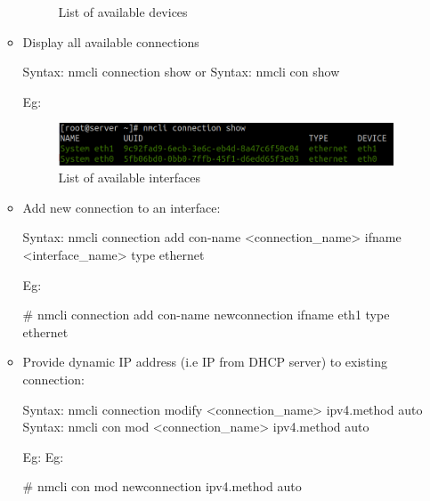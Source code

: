 \begin{flushleft}
\begin{itemize}
\begin{itemize}
\begin{figure}[h!]
			\caption{List of available devices}
			\label{fig:devices}
		\end{figure}		
		\newpage
		\item Display all available connections
		\begin{tcolorbox}[breakable,notitle,boxrule=-0pt,colback=pink,colframe=pink]
			\color{black}
			\font=9pt
			Syntax: nmcli connection show
			\newline
			or
			\newline
			Syntax: nmcli con show
			\font=4pt
		\end{tcolorbox}
		Eg:
		\begin{figure}[h!]
			\centering
			\includegraphics[scale=.35]{content/chapter14/images/show.png}
			\caption{List of available interfaces}
			\label{fig:list}
		\end{figure}		
	
		\bigskip
		\bigskip
		\item Add new connection to an interface:
		\begin{tcolorbox}[breakable,notitle,boxrule=-0pt,colback=pink,colframe=pink]
			\color{black}
			\font=9pt
			Syntax: nmcli connection add con-name <connection\_name> ifname <interface\_name> type ethernet
			\font=4pt
		\end{tcolorbox}

		Eg:	
		\begin{tcolorbox}[breakable,notitle,boxrule=-0pt,colback=black,colframe=black]
			\color{green}
			\font=9pt
			\# nmcli connection add con-name newconnection ifname eth1 type ethernet
			\font=4pt
		\end{tcolorbox}

		\bigskip
		\bigskip
		\item Provide dynamic IP address (i.e IP from DHCP server) to existing connection:
		\begin{tcolorbox}[breakable,notitle,boxrule=-0pt,colback=pink,colframe=pink]
			\color{black}
			\font=9pt
			Syntax: nmcli connection modify <connection\_name> ipv4.method auto
			\newline
			\newline
			Syntax: nmcli con mod <connection\_name> ipv4.method auto
			\font=4pt
		\end{tcolorbox}
		Eg:
		Eg:	
		\begin{tcolorbox}[breakable,notitle,boxrule=-0pt,colback=black,colframe=black]
			\color{green}
			\font=9pt
			\# nmcli con mod newconnection ipv4.method auto
			\font=4pt
		\end{tcolorbox}
		


\end{itemize}
\end{itemize}
\end{flushleft}
